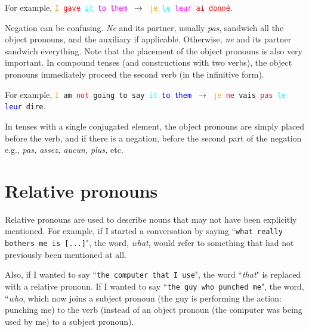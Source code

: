 \documentclass[11pt, oneside]{book}
\begin{document}
{{{For example, \texttt{\textcolor{orange}{I} \textcolor{red}{gave} \textcolor{cyan}{it} \textcolor{magenta}{to them} $\rightarrow$ \textcolor{orange}{je} \textcolor{cyan}{le} \textcolor{magenta}{leur} \textcolor{red}{ai donn\'e}}. \vspace{0.5\baselineskip}

Negation can be confusing. \textit{Ne} and its partner, usually \textit{pas}, sandwich all the object pronouns, and the auxiliary if applicable. Otherwise, \textit{ne} and its partner sandwich everything. Note that the placement of the object pronouns is also very important. In compound tenses (and constructions with two verbs), the object pronouns immediately proceed the second verb (in the infinitive form).\vspace{0.5\baselineskip}

For example, \texttt{\textcolor{orange}{I} \textcolor{green!50!orange}{am} \textcolor{red}{not} \textcolor{green!50!orange}{going to} \textcolor{magenta!70}{say} \textcolor{cyan}{it} \textcolor{blue}{to them} $\rightarrow$ \textcolor{orange}{je} \textcolor{red}{ne} \textcolor{green!50!orange}{vais} \textcolor{red}{pas} \textcolor{cyan}{le} \textcolor{blue}{leur} \textcolor{magenta!70}{dire}}. \vspace{0.5\baselineskip} 

In tenses with a single conjugated element, the object pronouns are simply placed before the verb, and if there is a negation, before the second part of the negation e.g., \textit{pas, assez, aucun, plus,} etc. \vspace{0.5\baselineskip}

\section{Relative pronouns}

Relative pronouns are used to describe nouns that may not have been explicitly mentioned. For example, if I started a conversation by saying ``\texttt{what really bothers me is [...]}", the word, \textit{what}, would refer to something that had not previously been mentioned at all. \vspace{0.5\baselineskip}

	Also, if I wanted to say ``\texttt{the computer that I use}", the word ``\textit{that}" is replaced with a relative pronoun. If I wanted to say ``\texttt{the guy who punched me}", the word, ``\textit{who}, which now joins a subject pronoun (the guy is performing the action: punching me) to the verb (instead of an object pronoun (the computer was being used by me) to a subject pronoun). \vspace{0.5\baselineskip}
	
}}}
\end{document}
